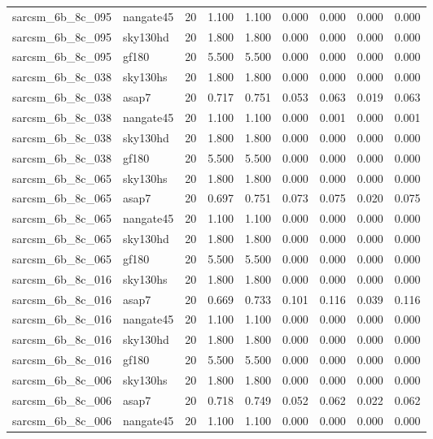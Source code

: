\begin{tabular}{llrrrrrrr}
sarcsm\_6b\_8c\_095 & nangate45 & 20 & 1.100 & 1.100 & 0.000 & 0.000 & 0.000 & 0.000 \\
sarcsm\_6b\_8c\_095 & sky130hd & 20 & 1.800 & 1.800 & 0.000 & 0.000 & 0.000 & 0.000 \\
sarcsm\_6b\_8c\_095 & gf180 & 20 & 5.500 & 5.500 & 0.000 & 0.000 & 0.000 & 0.000 \\
sarcsm\_6b\_8c\_038 & sky130hs & 20 & 1.800 & 1.800 & 0.000 & 0.000 & 0.000 & 0.000 \\
sarcsm\_6b\_8c\_038 & asap7 & 20 & 0.717 & 0.751 & 0.053 & 0.063 & 0.019 & 0.063 \\
sarcsm\_6b\_8c\_038 & nangate45 & 20 & 1.100 & 1.100 & 0.000 & 0.001 & 0.000 & 0.001 \\
sarcsm\_6b\_8c\_038 & sky130hd & 20 & 1.800 & 1.800 & 0.000 & 0.000 & 0.000 & 0.000 \\
sarcsm\_6b\_8c\_038 & gf180 & 20 & 5.500 & 5.500 & 0.000 & 0.000 & 0.000 & 0.000 \\
sarcsm\_6b\_8c\_065 & sky130hs & 20 & 1.800 & 1.800 & 0.000 & 0.000 & 0.000 & 0.000 \\
sarcsm\_6b\_8c\_065 & asap7 & 20 & 0.697 & 0.751 & 0.073 & 0.075 & 0.020 & 0.075 \\
sarcsm\_6b\_8c\_065 & nangate45 & 20 & 1.100 & 1.100 & 0.000 & 0.000 & 0.000 & 0.000 \\
sarcsm\_6b\_8c\_065 & sky130hd & 20 & 1.800 & 1.800 & 0.000 & 0.000 & 0.000 & 0.000 \\
sarcsm\_6b\_8c\_065 & gf180 & 20 & 5.500 & 5.500 & 0.000 & 0.000 & 0.000 & 0.000 \\
sarcsm\_6b\_8c\_016 & sky130hs & 20 & 1.800 & 1.800 & 0.000 & 0.000 & 0.000 & 0.000 \\
sarcsm\_6b\_8c\_016 & asap7 & 20 & 0.669 & 0.733 & 0.101 & 0.116 & 0.039 & 0.116 \\
sarcsm\_6b\_8c\_016 & nangate45 & 20 & 1.100 & 1.100 & 0.000 & 0.000 & 0.000 & 0.000 \\
sarcsm\_6b\_8c\_016 & sky130hd & 20 & 1.800 & 1.800 & 0.000 & 0.000 & 0.000 & 0.000 \\
sarcsm\_6b\_8c\_016 & gf180 & 20 & 5.500 & 5.500 & 0.000 & 0.000 & 0.000 & 0.000 \\
sarcsm\_6b\_8c\_006 & sky130hs & 20 & 1.800 & 1.800 & 0.000 & 0.000 & 0.000 & 0.000 \\
sarcsm\_6b\_8c\_006 & asap7 & 20 & 0.718 & 0.749 & 0.052 & 0.062 & 0.022 & 0.062 \\
sarcsm\_6b\_8c\_006 & nangate45 & 20 & 1.100 & 1.100 & 0.000 & 0.000 & 0.000 & 0.000 \\

\end{tabular}
